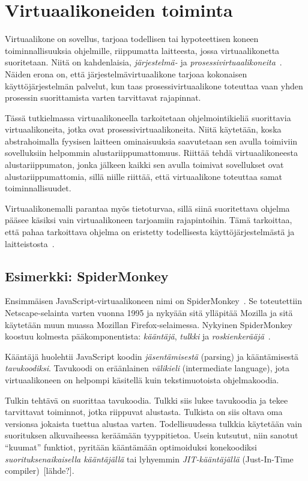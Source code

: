 \section{Virtuaalikoneiden toiminta}

Virtuaalikone on sovellus, tarjoaa todellisen tai hypoteettisen koneen toiminnallisuuksia ohjelmille, riippumatta laitteesta, jossa virtuaalikonetta suoritetaan. Niitä on kahdenlaisia, \textit{järjestelmä-} ja \textit{prosessivirtuaalikoneita}~\cite[s.~33]{vms}. Näiden erona on, että järjestelmävirtuaalikone tarjoaa kokonaisen käyttöjärjestelmän palvelut, kun taas prosessivirtuaalikone toteuttaa vaan yhden prosessin suorittamista varten tarvittavat rajapinnat.

Tässä tutkielmassa virtuaalikoneella tarkoitetaan ohjelmointikieliä suorittavia virtuaalikoneita, jotka ovat prosessivirtuaalikoneita. Niitä käytetään, koska abstrahoimalla fyysisen laitteen ominaisuuksia saavutetaan sen avulla toimiviin sovelluksiin helpommin alustariippumattomuus. Riittää tehdä virtuaalikoneesta alustariippumaton, jonka jälkeen kaikki sen avulla toimivat sovellukset ovat alustariippumattomia, sillä niille riittää, että virtuaalikone toteuttaa samat toiminnallisuudet.

Virtuaalikonemalli parantaa myös tietoturvaa, sillä siinä suoritettava ohjelma pääsee käsiksi vain virtuaalikoneen tarjoamiin rajapintoihin. Tämä tarkoittaa, että pahaa tarkoittava ohjelma on eristetty todellisesta käyttöjärjestelmästä ja laitteistosta~\cite[s.~36]{vms}.

\subsection{Esimerkki: SpiderMonkey}

Ensimmäisen JavaScript-virtuaalikoneen nimi on SpiderMonkey~\cite{spidermonkey}. Se toteutettiin Netscape-selainta varten vuonna 1995 ja nykyään sitä ylläpitää Mozilla ja sitä käytetään muun muassa Mozillan Firefox-selaimessa. Nykyinen SpiderMonkey koostuu kolmesta pääkomponentista: \textit{kääntäjä}, \textit{tulkki} ja \textit{roskienkerääjä}~\cite{spidermonkeydesign}.

Kääntäjä huolehtii JavaScript koodin \textit{jäsentämisestä} (parsing) ja kääntämisestä \textit{tavukoodiksi}. Tavukoodi on eräänlainen \textit{välikieli} (intermediate language), jota virtuaalikoneen on helpompi käsitellä kuin tekstimuotoista ohjelmakoodia.

Tulkin tehtävä on suorittaa tavukoodia. Tulkki siis lukee tavukoodia ja tekee tarvittavat toiminnot, jotka riippuvat alustasta. Tulkista on siis oltava oma versionsa jokaista tuettua alustaa varten. Todellisuudessa tulkkia käytetään vain suorituksen alkuvaiheessa keräämään tyyppitietoa. Usein kutsutut, niin sanotut ``kuumat'' funktiot, pyritään kääntämään optimoiduksi konekoodiksi \textit{suorituksenaikaisella kääntäjällä} tai lyhyemmin \textit{JIT-kääntäjällä} (Just-In-Time compiler)~[lähde?].

